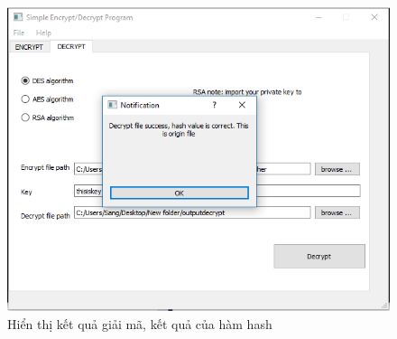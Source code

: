 \documentclass[a4paper]{article}
\begin{document}
\begin{itemize}
\begin{center}
\begin{figure}[H]
\begin{center}
     \includegraphics[scale=.5]{hinh/decrypt-des-2}
    \end{center}
    \caption{Hiển thị kết quả giải mã, kết quả của hàm hash}
    \label{refhinh11}
    \end{figure}
\end{center}
\end{itemize}
\end{document}

